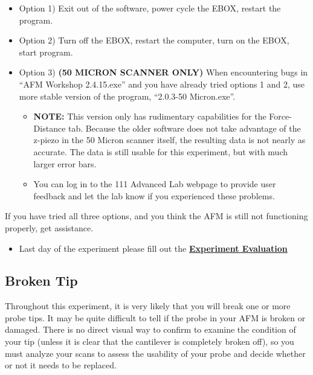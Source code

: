 \documentclass{../lab}
\begin{document}
\begin{itemize}
    \item Option 1) Exit out of the software, power cycle the EBOX, restart the program.

    \item Option 2) Turn off the EBOX, restart the computer, turn on the EBOX, start program.

    \item Option 3) \textbf{(50 MICRON SCANNER ONLY)} When encountering bugs in ``AFM Workshop 2.4.15.exe'' and you have already tried options 1 and 2, use more stable version of the program, ``2.0.3-50 Micron.exe''.
    
    \begin{itemize}
        \item \textbf{NOTE:} This version only has rudimentary capabilities for the Force-Distance tab.  Because the older software does not take advantage of the z-piezo in the 50 Micron scanner itself, the resulting data is not nearly as accurate.  The data is still usable for this experiment, but with much larger error bars.

        \item You can log in to the 111 Advanced Lab webpage to provide user feedback and let the lab know if you experienced these problems.

    \end{itemize}

\end{itemize}

If you have tried all three options, and you think the AFM is still not functioning properly, get assistance.

\begin{itemize}
    \item Last day of the experiment please fill out the \href{\ExperimentEvaluation}{\textbf{Experiment Evaluation}}

\end{itemize}

\subsection{Broken Tip}
\label{subsec:BrokenTip}

Throughout this experiment, it is very likely that you will break one or more probe tips.  It may be quite difficult to tell if the probe in your AFM is broken or damaged.  There is no direct visual way to confirm to examine the condition of your tip (unless it is clear that the cantilever is completely broken off), so you must analyze your scans to assess the usability of your probe and decide whether or not it needs to be replaced.
\end{document}
